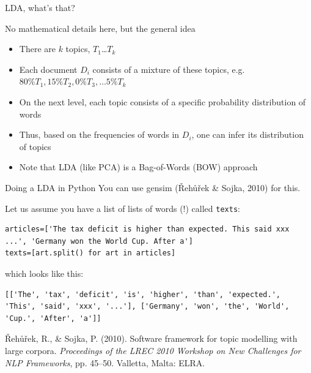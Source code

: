 \documentclass{beamer}
\begin{document}
\begin{frame}{LDA, what's that?}
	\begin{block}{No mathematical details here, but the general idea}
		\begin{itemize}
			\item There are $k$ topics, $T_1$\ldots$T_k$
			\item Each document $D_i$ consists of a mixture of these topics, e.g.$80\% T_1, 15\% T_2, 0\% T_3, \ldots 5\% T_k $
			\item On the next level, each topic consists of a specific probability distribution of words
			\item Thus, based on the frequencies of words in $D_i$, one can infer its distribution of topics
			\item Note that LDA (like PCA) is a Bag-of-Words (BOW) approach
		\end{itemize}
	\end{block}
	
\end{frame}




\begin{frame}[fragile]{Doing a LDA in Python}
You can use gensim ({\v R}eh{\r u}{\v r}ek \& Sojka, 2010) for this.

Let us assume you have a list of lists of words (!) called \texttt{texts}:

\begin{lstlisting}
articles=['The tax deficit is higher than expected. This said xxx ...', 'Germany won the World Cup. After a']
texts=[art.split() for art in articles]
\end{lstlisting}
which looks like this:
\begin{lstlisting}
[['The', 'tax', 'deficit', 'is', 'higher', 'than', 'expected.', 'This', 'said', 'xxx', '...'], ['Germany', 'won', 'the', 'World', 'Cup.', 'After', 'a']]
\end{lstlisting}

\tiny{{\v R}eh{\r u}{\v r}ek, R., \& Sojka, P. (2010). Software framework for topic modelling with large corpora. \emph{Proceedings of the LREC 2010 Workshop on New Challenges for NLP Frameworks}, pp. 45–50. Valletta, Malta: ELRA. }

\end{frame}
\end{document}
